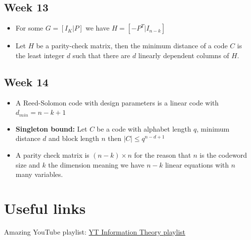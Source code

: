 \documentclass[titlepage]{article}
\begin{document}
\subsection{Week 13}

\begin{itemize}
    \item For some $G = [I_{K} | P]$ we have $H = [-P^{T}|I_{n-k}]$
    \item Let $H$ be a parity-check matrix, then the minimum distance of a code $C$ is the least integer $d$ such that there are $d$ linearly dependent columns of $H$.
\end{itemize}

\subsection{Week 14}
\begin{itemize}
    \item A Reed-Solomon code with design parameters is a linear code with $d_{min} = n - k + 1$
    \item \textbf{Singleton bound:} Let $C$ be a code with alphabet length $q$, minimum distance $d$ and block length $n$ then $|C| \leq q^{n-d+1}$
    \item A parity check matrix is $(n-k) \times n$ for the reason that $n$ is the codeword size and $k$ the dimension meaning we have $n-k$ linear equations with $n$ many variables.
\end{itemize}



\section{Useful links}
Amazing YouTube playlist: \hyperlink{ https://www.youtube.com/playlist?list=PLE125425EC837021F}{YT Information Theory playlist}
\end{document}
